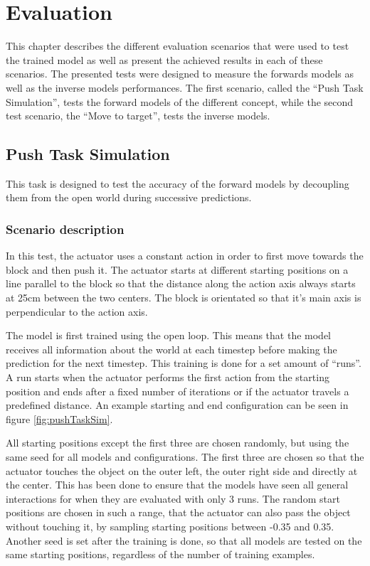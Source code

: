 \chapter{Evaluation\label{chap:evaluation}}

This chapter describes the different evaluation scenarios that were used to test the trained model 
as well as present the achieved results in each of these scenarios. The presented tests were 
designed to measure the forwards models as well as the inverse models performances. The first 
scenario, called the \enquote{Push Task Simulation}, tests the forward models of the different 
concept, while the second test scenario, the \enquote{Move to target}, tests the inverse models.

\section{Push Task Simulation}

This task is designed to test the accuracy of the forward models by decoupling them from the open 
world during successive predictions. 

\subsection{Scenario description}

In this test, the actuator uses a constant action in order to first move towards the block and then push it.
The actuator starts at different starting positions on a line parallel to the block so that the distance along
the action axis always starts at 25cm between the two centers. The block is orientated so that it's main axis
is perpendicular to the action axis.

The model is first trained using the open loop. This means that the model receives all information about the
world at each timestep before making the prediction for the next timestep. This training is done for a set amount
of \enquote{runs}. A run starts when the actuator performs the first action from the starting position and ends after a fixed 
number of iterations or if the actuator travels a predefined distance.
An example starting and end configuration can be seen in figure \ref{fig:pushTaskSim}. 

All starting positions except the first three are chosen randomly, but using the
same seed for all models and configurations. %
The first three are chosen so that the actuator touches the object on the outer left, the outer right side
and directly at the center. This has been done to ensure that the models have seen all general interactions for when they are evaluated with only 3
runs. The random start positions are chosen in such a range, that the actuator can also pass the object without touching it, by sampling starting positions
between -0.35 and 0.35. Another seed is set after the training is done, so that all models are tested on the same starting positions, regardless of
the number of training examples.

